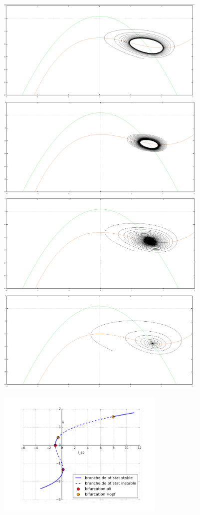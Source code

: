 \documentclass[xcolor={dvipsnames},10pt]{beamer}
\begin{document}
\begin{frame}
  {\includegraphics[height=5cm]{I_015}}
  {\includegraphics[height=5cm]{I_016}}
   {\includegraphics[height=5cm]{I_017}}
    {\includegraphics[height=5cm]{I_018}}


\end{frame}


\begin{frame}
\begin{center}
\includegraphics[width=0.6\textwidth]{bif4.png}
\end{center}
\end{frame}
\end{document}
